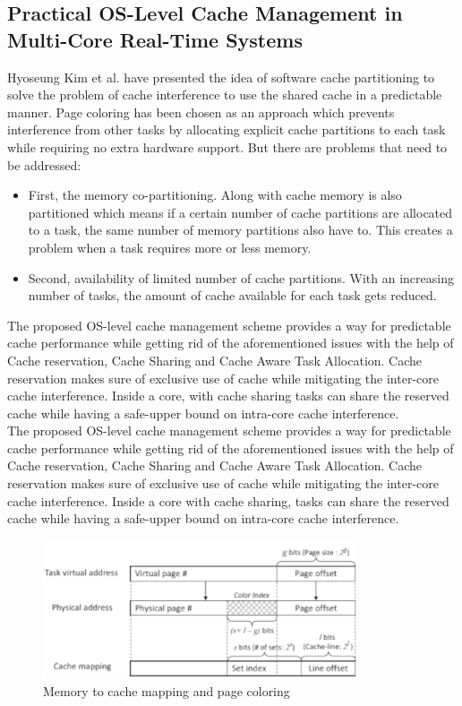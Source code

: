 \documentclass[conference]{IEEEtran}
\begin{document}
\subsection{\textbf{Practical OS-Level Cache Management in Multi-Core Real-Time Systems\cite{b2}}}
    Hyoseung Kim et al.\cite{b2} have presented the idea of software cache partitioning to solve the problem of cache interference to use the shared cache in a predictable manner. Page coloring has been chosen as an approach which prevents interference from other tasks by allocating explicit cache partitions to each task while requiring no extra hardware support.
    But there are problems that need to be addressed:\\
    \begin{itemize}
        \item First, the memory co-partitioning. Along with cache memory is also partitioned which means if a certain number of cache partitions are allocated to a task, the same number of memory partitions also have to. This creates a problem when a task requires more or less memory.
        \item Second, availability of limited number of cache partitions. With an increasing number of tasks, the amount of cache available for each task gets reduced.
    \end{itemize}
    The proposed OS-level cache management scheme provides a way for predictable cache performance while getting rid of the aforementioned issues with the help of Cache reservation, Cache Sharing and Cache Aware Task Allocation. Cache reservation makes sure of exclusive use of cache while mitigating the inter-core cache interference. Inside a core, with cache sharing tasks can share the reserved cache while having a safe-upper bound on intra-core cache interference.\\
    The proposed OS-level cache management scheme provides a way for predictable cache performance while getting rid of the aforementioned issues with the help of Cache reservation, Cache Sharing and Cache Aware Task Allocation. Cache reservation makes sure of exclusive use of cache while mitigating the inter-core cache interference. Inside a core with cache sharing, tasks can share the reserved cache while having a safe-upper bound on intra-core cache interference.\\
    \begin{figure}[htbp]
        \centerline{\includegraphics{Page_coloring.png}}
        \caption{Memory to cache mapping and page coloring\cite{b2}}
        \label{fig_b_1}
    \end{figure}
\end{document}
